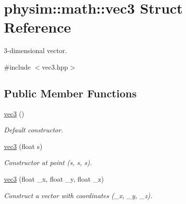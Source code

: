 \hypertarget{structphysim_1_1math_1_1vec3}{}\section{physim\+:\+:math\+:\+:vec3 Struct Reference}
\label{structphysim_1_1math_1_1vec3}


3-\/dimensional vector.  




{\ttfamily \#include $<$vec3.\+hpp$>$}

\subsection*{Public Member Functions}
\begin{DoxyCompactItemize}
\item 
\mbox{\label{structphysim_1_1math_1_1vec3_a732723c9e7eb0f0317f627dedf9213eb}} 
\hyperlink{structphysim_1_1math_1_1vec3_a732723c9e7eb0f0317f627dedf9213eb}{vec3} ()
\begin{DoxyCompactList}\small\item\em Default constructor. \end{DoxyCompactList}\item 
\mbox{\label{structphysim_1_1math_1_1vec3_a00f65b2bba7c5035c42cf84f6ba91e36}} 
\hyperlink{structphysim_1_1math_1_1vec3_a00f65b2bba7c5035c42cf84f6ba91e36}{vec3} (float s)
\begin{DoxyCompactList}\small\item\em Constructor at point ({\itshape s}, {\itshape s}, {\itshape s}). \end{DoxyCompactList}\item 
\mbox{\label{structphysim_1_1math_1_1vec3_aaebcfcc0003ab74c87d7e338d48074e2}} 
\hyperlink{structphysim_1_1math_1_1vec3_aaebcfcc0003ab74c87d7e338d48074e2}{vec3} (float \+\_\+x, float \+\_\+y, float \+\_\+z)
\begin{DoxyCompactList}\small\item\em Construct a vector with coordinates ({\itshape \+\_\+x}, {\itshape \+\_\+y}, {\itshape \+\_\+z}). \end{DoxyCompactList}\item 
\mbox{\label{structphysim_1_1math_1_1vec3_a642e0c0de2dd923c0cb9298fa0387a02}} 

\end{DoxyCompactItemize}
